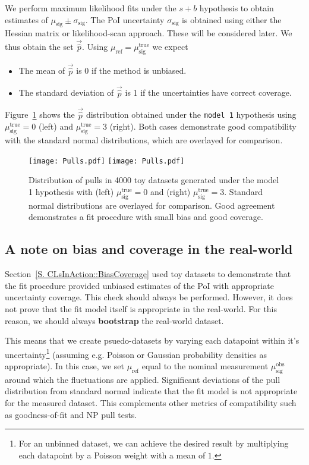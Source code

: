 We perform maximum likelihood fits under the $s+b$ hypothesis to obtain estimates of $\mu_\text{sig}\pm\sigma_\text{sig}$. The PoI uncertainty $\sigma_\text{sig}$ is obtained using either the Hessian matrix or likelihood-scan approach. These will be considered later. We thus obtain the set $\vec{\hat{p}}$. Using $\mu_\text{ref}=\mu_\text{sig}^\text{true}$ we expect
\begin{itemize}
\item The mean of $\vec{\hat{p}}$ is 0 if the method is unbiased.
\item The standard deviation of $\vec{\hat{p}}$ is 1 if the uncertainties have correct coverage.
\end{itemize}

Figure~\ref{F. Pulls} shows the $\vec{\hat{p}}$ distribution obtained under the \texttt{model 1} hypothesis using $\mu_\text{sig}^\text{true}=0$ (left) and $\mu_\text{sig}^\text{true}=3$ (right). Both cases demonstrate good compatibility with the standard normal distributions, which are overlayed for comparison.

\begin{figure}[t!]
\centering
\texttt{[image: Pulls.pdf]}
\texttt{[image: Pulls.pdf]}
\caption{Distribution of pulls in 4000 toy datasets generated under the model 1 hypothesis with (left) $\mu_\text{sig}^\text{true}=0$ and (right) $\mu_\text{sig}^\text{true}=3$. Standard normal distributions are overlayed for comparison. Good agreement demonstrates a fit procedure with small bias and good coverage.}
\label{F. Pulls}
\end{figure}





\subsection{A note on bias and coverage in the real-world}
\label{S. CLsInAction::BiasCoverage2}

Section~\ref{S. CLsInAction::BiasCoverage} used toy datasets to demonstrate that the fit procedure provided unbiased estimates of the PoI with appropriate uncertainty coverage. This check should always be performed. However, it does not prove that the fit model itself is appropriate in the real-world. For this reason, we should always \textbf{bootstrap} the real-world dataset.

This means that we create psuedo-datasets by varying each datapoint within it's uncertainty\footnote{For an unbinned dataset, we can achieve the desired result by multiplying each datapoint by a Poisson weight with a mean of $1$.} (assuming e.g. Poisson or Gaussian probability densities as appropriate). In this case, we set $\mu_\text{ref}$ equal to the nominal measurement $\mu_\text{sig}^\text{obs}$ around which the fluctuations are applied. Significant deviations of the pull distribution from standard normal indicate that the fit model is not appropriate for the measured dataset. This complements other metrics of compatibility such as goodness-of-fit and NP pull tests.

